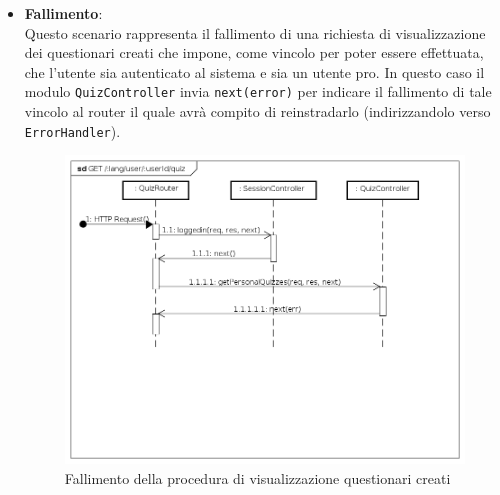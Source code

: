 \begin{itemize}
\item \textbf{Fallimento}:\\
Questo scenario rappresenta il fallimento di una richiesta di visualizzazione dei questionari creati che impone, come vincolo per poter essere effettuata, che l'utente sia autenticato al sistema e sia un utente pro. In questo caso il modulo \texttt{QuizController} invia \texttt{next(error)} per indicare il fallimento di tale vincolo al router il quale avrà compito di reinstradarlo (indirizzandolo verso \texttt{ErrorHandler}).
\label{Fallimento della procedura di visualizzazione questionari creati}
\begin{figure}[ht]
	\centering
	\includegraphics[scale=0.40]{UML/DiagrammiDiSequenza/Back-end/GET__lang_user_userId_quiz_failure.png}
	\caption{Fallimento della procedura di visualizzazione questionari creati}
\end{figure}
\FloatBarrier
\end{itemize}

